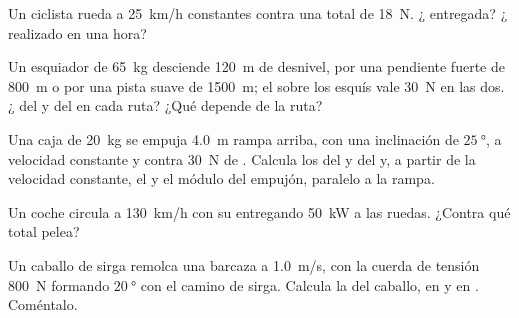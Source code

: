 \begin{exercise}[$\star\star$]\label{exo:g11:work-of-force:7}
Un ciclista rueda a \qty{25}{km/h} constantes contra una 
total de \qty{18}{N}. ¿ entregada? ¿ realizado en una
hora?
\end{exercise}

\begin{exercise}[$\star\star$]\label{exo:g11:work-of-force:8}
Un esquiador de \qty{65}{kg} desciende \qty{120}{m} de desnivel, por una
pendiente fuerte de \qty{800}{m} o por una pista suave de \qty{1500}{m};
el  sobre los esquís vale \qty{30}{N} en las dos. ¿ del
 y del  en cada ruta? ¿Qué  depende de la ruta?
\end{exercise}

\begin{exercise}[$\star\star$]\label{exo:g11:work-of-force:9}
Una caja de \qty{20}{kg} se empuja \qty{4.0}{m} rampa arriba, con una
inclinación de $\qty{25}{\degree}$, a velocidad constante y contra
\qty{30}{N} de . Calcula los  del  y del
 y, a partir de la velocidad constante, el  y el módulo
del empujón, paralelo a la rampa.
\end{exercise}

\begin{exercise}[$\star\star$]\label{exo:g11:work-of-force:10}
Un coche circula a \qty{130}{km/h} con su  entregando \qty{50}{kW}
a las ruedas. ¿Contra qué   total pelea?
\end{exercise}

\begin{exercise}[$\star\star$]\label{exo:g11:work-of-force:11}
Un caballo de sirga remolca una barcaza a \qty{1.0}{m/s}, con la cuerda
de tensión \qty{800}{N} formando $\qty{20}{\degree}$ con el camino de
sirga. Calcula la  del caballo, en  y en . Coméntalo.
\end{exercise}

